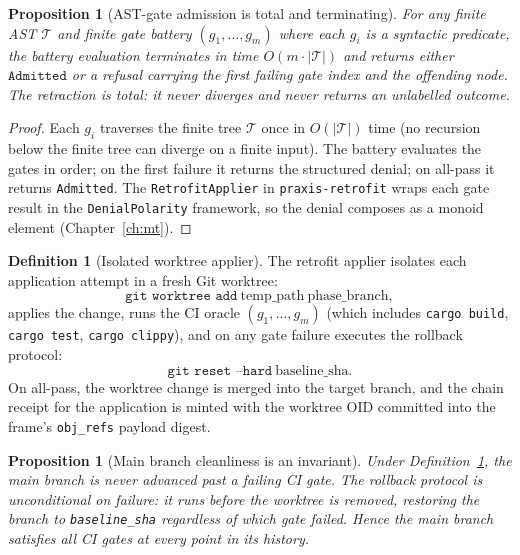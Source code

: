\documentclass[11pt,oneside]{book}
\theoremstyle{definition}
\newtheorem{definition}{Definition}[chapter]
\theoremstyle{plain}
\newtheorem{proposition}[theorem]{Proposition}
\theoremstyle{remark}
\newcommand{\code}[1]{\texttt{#1}}
\begin{document}
\begin{proposition}[AST-gate admission is total and terminating]\label{prop:astterm}
For any finite AST $\mathcal{T}$ and finite gate battery $(g_1,\dots,g_m)$ where each
$g_i$ is a syntactic predicate, the battery evaluation terminates in time
$O(m\cdot|\mathcal{T}|)$ and returns either $\code{Admitted}$ or a refusal carrying the
first failing gate index and the offending node. The retraction is total: it never
diverges and never returns an unlabelled outcome.
\end{proposition}

\begin{proof}
Each $g_i$ traverses the finite tree $\mathcal{T}$ once in $O(|\mathcal{T}|)$ time (no
recursion below the finite tree can diverge on a finite input). The battery evaluates the
gates in order; on the first failure it returns the structured denial; on all-pass it
returns \code{Admitted}. The \code{RetrofitApplier} in \code{praxis-retrofit} wraps each
gate result in the \code{DenialPolarity} framework, so the denial composes as a monoid
element (Chapter~\ref{ch:mt}).
\end{proof}

\begin{definition}[Isolated worktree applier]\label{def:worktree-ret}
The retrofit applier isolates each application attempt in a fresh Git worktree:
\[
\code{git worktree add}\ \text{temp\_path}\ \text{phase\_branch},
\]
applies the change, runs the CI oracle $(g_1,\dots,g_m)$ (which includes
\code{cargo build}, \code{cargo test}, \code{cargo clippy}), and on any gate failure
executes the rollback protocol:
\[
\code{git reset --hard}\ \text{baseline\_sha}.
\]
On all-pass, the worktree change is merged into the target branch, and the chain receipt
for the application is minted with the worktree OID committed into the frame's
\code{obj\_refs} payload digest.
\end{definition}

\begin{proposition}[Main branch cleanliness is an invariant]\label{prop:mainclean}
Under Definition~\ref{def:worktree-ret}, the main branch is never advanced past a
failing CI gate. The rollback protocol is unconditional on failure: it runs before the
worktree is removed, restoring the branch to \code{baseline\_sha} regardless of which
gate failed. Hence the main branch satisfies all CI gates at every point in its history.
\end{proposition}
\end{document}
